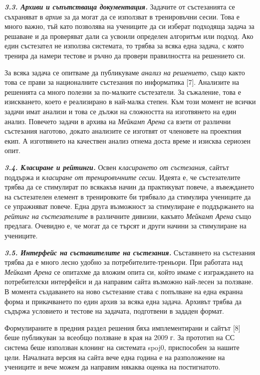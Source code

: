 \documentclass[11pt]{article}
\begin{document}
\textbf{\textit{3.3. Архиви и съпътстваща документация.}} Задачите
от състезанията се съхраняват в \textit{архив} за да могат да се
използват в тренировъчни сесии. Това е много важно, тъй като
позволява на учениците да си изберат подходяща задача за решаване и
да проверяват дали са усвоили определен алгоритъм или подход. Ако
един състезател не използва системата, то трябва за всяка една
задача, с която тренира да намери тестове и ръчно да провери
правилността на решението си.

За всяка задача се опитваме да публикуваме \textit{анализ на
решението}, също както това се прави за националните състезания по информатика [7]. Анализите на решенията са много полезни за по-малките
състезатели. За съжаление, това е изискването, което е реализирано в
най-малка степен. Към този момент не всички задачи имат анализи и
това се дължи на сложността на изготвянето на един анализ. Повечето
задачи в архива на \textit{Мейкамп Арена} са взети от различни
състезания наготово, докато анализите се изготвят от членовете на
проектния екип. А изготвянето на качествен анализ отнема доста време
и изисква сериозен опит.

\textbf{\textit{3.4. Класиране и рейтинги.}} Освен
\textit{класирането от състезания}, сайтът поддържа и
\textit{класиране от тренировъчните сесии}. Идеята е, че
състезателите трябва да се стимулират по всякакъв начин да
практикуват повече, а въвеждането на състезателен елемент в
тренировките би трябвало да стимулира учениците да се упражняват
повече. Една друга възможност за стимулиране е поддържането на
\textit{рейтинг на състезателите} в различните дивизии, какъвто
\textit{Мейкамп Арена} също предлага. Очевидно е, че могат да се
търсят и други начини за стимулиране на учениците.

\textbf{\textit{3.5. Интерфейс на съставителите на състезания.}}
Съставянето на състезания трябва да е много лесно удобно за
потребителите-треньори. При работата над \textit{Мейкамп Арена} се
опитахме да вложим опита си, който имаме с изграждането на
потребителски интерфейси и да направим сайта възможно най-лесен за
ползване. В момента създаването на ново състезание става с попълване
на една екранна форма и прикачването по един архив за всяка една
задача. Архивът трябва да съдържа условието и тестове на задачата,
подготвени в зададен формат.

Формулираните в предния раздел решения бяха имплементирани и сайтът
[8] беше публикуван за всеобщо ползване в края на 2009 г. За
прототип на СС система беше използван клонинг на системата spoj0,
приспособен за нашите цели. Началната версия на сайта вече една
година е на разположение на учениците и вече можем да направим
някаква оценка на постигнатото.
\end{document}
